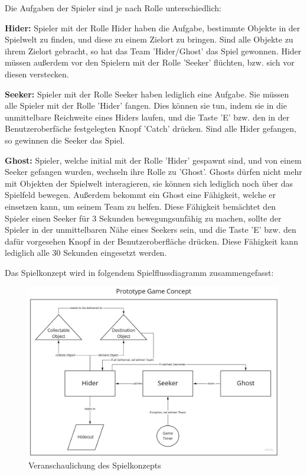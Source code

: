 Die Aufgaben der Spieler sind je nach Rolle unterschiedlich:

\textbf{Hider:}
Spieler mit der Rolle Hider haben die Aufgabe, bestimmte Objekte in der Spielwelt zu finden, und diese zu einem Zielort zu bringen. Sind alle Objekte zu ihrem Zielort gebracht, so hat das Team 'Hider/Ghost' das Spiel gewonnen. Hider müssen außerdem vor den Spielern mit der Rolle 'Seeker' flüchten, bzw. sich vor diesen verstecken. 

\textbf{Seeker:}
Spieler mit der Rolle Seeker haben lediglich eine Aufgabe. Sie müssen alle Spieler mit der Rolle 'Hider' fangen. Dies können sie tun, indem sie in die unmittelbare Reichweite eines Hiders laufen, und die Taste 'E' bzw. den in der Benutzeroberfäche festgelegten Knopf 'Catch' drücken. Sind alle Hider gefangen, so gewinnen die Seeker das Spiel.

\textbf{Ghost:}
Spieler, welche initial mit der Rolle 'Hider' gespawnt sind, und von einem Seeker gefangen wurden, wechseln ihre Rolle zu 'Ghost'. Ghosts dürfen nicht mehr mit Objekten der Spielwelt interagieren, sie können sich lediglich noch über das Spielfeld bewegen. Außerdem bekommt ein Ghost eine Fähigkeit, welche er einsetzen kann, um seinem Team zu helfen. Diese Fähigkeit bemächtet den Spieler einen Seeker für 3 Sekunden bewegungsunfähig zu machen, sollte der Spieler in der unmittelbaren Nähe eines Seekers sein, und die Taste 'E' bzw. den dafür vorgesehen Knopf in der Benutzeroberfläche drücken. Diese Fähigkeit kann lediglich alle 30 Sekunden eingesetzt werden.

Das Spielkonzept wird in folgendem Spielflussdiagramm zusammengefasst:

\begin{figure}[H]
	\centering
	\includegraphics[width=150mm]{images/game_concept.jpg}
	\caption[Spielkonzept Diagramm]{Veranschaulichung des Spielkonzepts}
	\label{pic:game_concept}
\end{figure}

